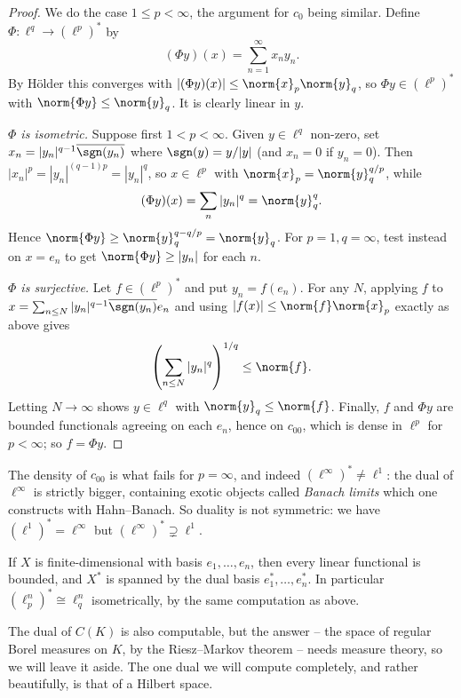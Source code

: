 \begin{proof}
	We do the case $1 \leq p < \infty$, the argument for $c_0$ being similar. Define $\Phi : \ell^q \to (\ell^p)^*$ by
	$$(\Phi y)(x) = \sum_{n=1}^\infty x_n y_n.$$
	By Hölder this converges with $|(\Phi y)(x)| \leq \norm{x}_p \norm{y}_q$, so $\Phi y \in (\ell^p)^*$ with $\norm{\Phi y} \leq \norm{y}_q$. It is clearly linear in $y$.

	\emph{$\Phi$ is isometric.} Suppose first $1 < p < \infty$. Given $y \in \ell^q$ non-zero, set $x_n = |y_n|^{q-1} \overline{\sgn(y_n)}$ where $\sgn(y) = y/|y|$ (and $x_n = 0$ if $y_n = 0$). Then $|x_n|^p = |y_n|^{(q-1)p} = |y_n|^q$, so $x \in \ell^p$ with $\norm{x}_p = \norm{y}_q^{q/p}$, while
	$$(\Phi y)(x) = \sum_n |y_n|^q = \norm{y}_q^q.$$
	Hence $\norm{\Phi y} \geq \norm{y}_q^{q - q/p} = \norm{y}_q$. For $p = 1, q = \infty$, test instead on $x = e_n$ to get $\norm{\Phi y} \geq |y_n|$ for each $n$.

	\emph{$\Phi$ is surjective.} Let $f \in (\ell^p)^*$ and put $y_n = f(e_n)$. For any $N$, applying $f$ to $x = \sum_{n \leq N} |y_n|^{q-1}\overline{\sgn(y_n)}e_n$ and using $|f(x)| \leq \norm{f}\norm{x}_p$ exactly as above gives
	$$\left(\sum_{n \leq N} |y_n|^q\right)^{1/q} \leq \norm{f}.$$
	Letting $N \to \infty$ shows $y \in \ell^q$ with $\norm{y}_q \leq \norm{f}$. Finally, $f$ and $\Phi y$ are bounded functionals agreeing on each $e_n$, hence on $c_{00}$, which is dense in $\ell^p$ for $p < \infty$; so $f = \Phi y$.
\end{proof}

\begin{remark}
	The density of $c_{00}$ is what fails for $p = \infty$, and indeed $(\ell^\infty)^* \neq \ell^1$: the dual of $\ell^\infty$ is strictly bigger, containing exotic objects called \emph{Banach limits} which one constructs with Hahn--Banach. So duality is not symmetric: we have $(\ell^1)^* = \ell^\infty$ but $(\ell^\infty)^* \supsetneq \ell^1$.
\end{remark}

\begin{example}
	If $X$ is finite-dimensional with basis $e_1, \dots, e_n$, then every linear functional is bounded, and $X^*$ is spanned by the dual basis $e_1^*, \dots, e_n^*$. In particular $(\ell_p^n)^* \cong \ell_q^n$ isometrically, by the same computation as above.
\end{example}

The dual of $C(K)$ is also computable, but the answer -- the space of regular Borel measures on $K$, by the Riesz--Markov theorem -- needs measure theory, so we will leave it aside. The one dual we will compute completely, and rather beautifully, is that of a Hilbert space.

